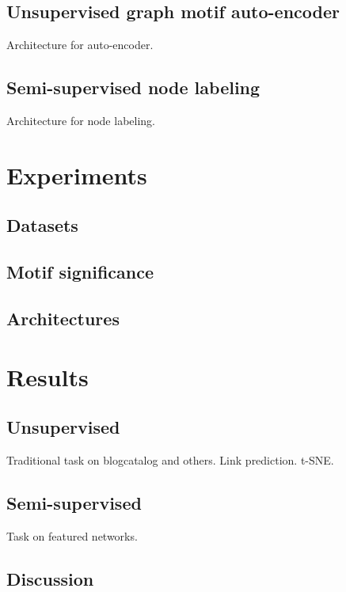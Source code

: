 \documentclass{article}
\theoremstyle{definition}
\begin{document}
\subsection{Unsupervised graph motif auto-encoder}

Architecture for auto-encoder.

\subsection{Semi-supervised node labeling}

Architecture for node labeling.

\section{Experiments}

\subsection{Datasets}

\subsection{Motif significance}

\subsection{Architectures}

\section{Results}

\subsection{Unsupervised}

Traditional task on blogcatalog and others.
Link prediction.
t-SNE.

\subsection{Semi-supervised}

Task on featured networks.

\subsection{Discussion}
\end{document}
